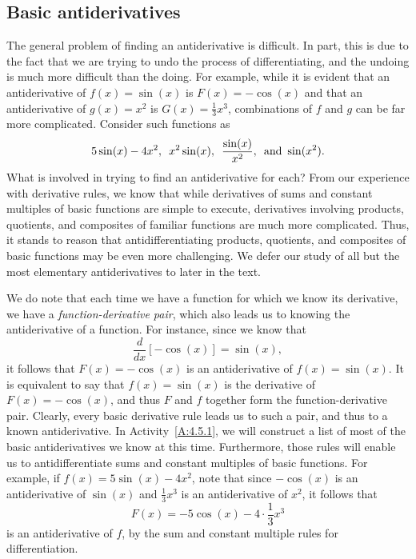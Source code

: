 \subsection*{Basic antiderivatives}

The general problem of finding an antiderivative is difficult.  In part, this is due to the fact that we are trying to undo the process of differentiating, and the undoing is much more difficult than the doing.  For example, while it is evident that an antiderivative of $f(x) = \sin(x)$ is $F(x) = -\cos(x)$ and that an antiderivative of $g(x) = x^2$ is $G(x) = \frac{1}{3} x^3$, combinations of $f$ and $g$ can be far more complicated.  Consider such functions as
\[ 5\sin(x) - 4x^2, \enskip x^2 \sin(x), \enskip \frac{\sin(x)}{x^2}, \enskip \mbox{and} \ \sin(x^2). \]
What is involved in trying to find an antiderivative for each?  From our experience with derivative rules, we know that while derivatives of sums and constant multiples of  basic functions are simple to execute, derivatives involving products, quotients, and composites of familiar functions are much more complicated.  Thus, it stands to reason that antidifferentiating products, quotients, and composites of basic functions may be even more challenging.  We defer our study of all but the most elementary antiderivatives to later in the text.

We do note that each time we have a function for which we know its derivative, we have a \emph{function-derivative pair}, which also leads us to knowing the antiderivative of a function.  For instance, since we know that 
\[ \frac{d}{dx}[-\cos(x)] = \sin(x), \]
it follows that $F(x) = -\cos(x)$ is an antiderivative of $f(x) = \sin(x)$.  It is equivalent to say that $f(x) = \sin(x)$ is the derivative of $F(x) = -\cos(x)$, and thus $F$ and $f$ together form the function-derivative pair.  Clearly, every basic derivative rule leads us to such a pair, and thus to a known antiderivative.   In Activity~\ref{A:4.5.1}, we will construct a list of most of the basic antiderivatives we know at this time.  Furthermore, those rules will enable us to antidifferentiate sums and constant multiples of basic functions.  For example, if $f(x) = 5\sin(x) - 4x^2$, note that since $-\cos(x)$ is an antiderivative of $\sin(x)$ and $\frac{1}{3}x^3$ is an antiderivative of $x^2$, it follows that 
\[ F(x) = -5\cos(x) - 4\cdot \frac{1}{3}x^3 \]
is an antiderivative of $f$, by the sum and constant multiple rules for differentiation.

